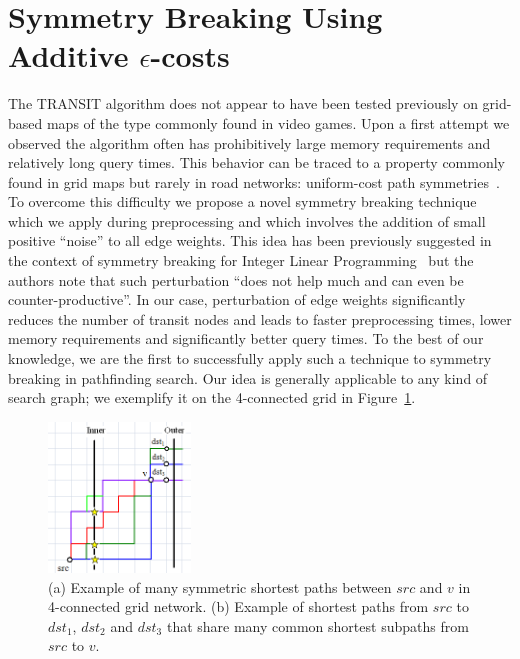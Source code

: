 \section{Symmetry Breaking Using Additive $\epsilon$-costs}
\label{sec:contribution}
The TRANSIT algorithm does not appear to have been tested previously on
grid-based maps of the type commonly found in video games.
Upon a first attempt we observed the algorithm often has
prohibitively large memory requirements and relatively long query times.
This behavior can be traced to a property commonly found in grid maps but rarely in
road networks: uniform-cost path symmetries~\cite{harabor11b}.
To overcome this difficulty we propose a novel symmetry breaking technique which we
apply during preprocessing and which involves the addition of small positive ``noise''
to all edge weights.
This idea has been previously suggested in the context of symmetry breaking for
Integer Linear Programming~\cite{margot09} but the authors note that such
perturbation ``does not help much and can even be counter-productive''.
In our case, perturbation of edge weights significantly reduces the number of transit nodes and 
leads to faster preprocessing times, lower memory
requirements and significantly better query times.
To the best of our knowledge, we are the first to successfully apply such a technique
to symmetry breaking in pathfinding search.
Our idea is generally applicable to any kind of search graph; we exemplify it
on the 4-connected grid in Figure~\ref{fig:symmetry_transit}.

\begin{figure}[tb]
\centering
\includegraphics[height=4cm]{diagrams/symmetry_transit.PNG}
\caption{
(a) Example of many symmetric shortest paths between $src$ and $v$ in 4-connected grid network.
(b) Example of shortest paths from $src$ to $dst_1$, $dst_2$ and $dst_3$ that share many common shortest subpaths from $src$ to $v$.
}
\label{fig:symmetry_transit}
\end{figure}

